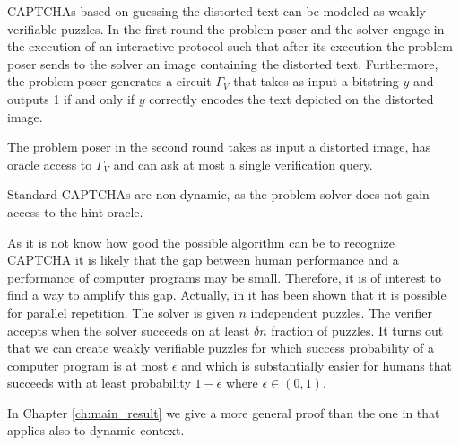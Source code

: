 CAPTCHAs based on guessing the distorted text can be modeled as weakly verifiable puzzles.
In the first round the problem poser and the solver engage in the execution of an interactive protocol
such that after its execution the problem poser sends to the solver an image containing the distorted text.
Furthermore, the problem poser generates a circuit $\Gamma_V$ that takes as input a bitstring $y$ and outputs 1 if and only if $y$ correctly encodes the
text depicted on the distorted image.

The problem poser in the second round takes as input a distorted image, has oracle access to $\Gamma_V$ and can ask at most a single verification query.

Standard CAPTCHAs are non-dynamic, as the problem solver does not gain access to the hint oracle.

As it is not know how good the possible algorithm can be to recognize CAPTCHA it is likely that the gap between human
performance and a performance of computer programs may be small. Therefore, it is of interest to find a way to amplify this gap.
Actually, in \cite{DBLP:journals/corr/abs-1002-3534} it has been shown that it is possible for parallel repetition.
The solver is given $n$ independent puzzles. The verifier accepts when the solver succeeds on at least $\delta n$ fraction of puzzles.
It turns out that we can create weakly verifiable puzzles for which success probability of a computer program is at most $\epsilon$ and
which is substantially easier for humans that succeeds with at least probability $1 - \epsilon$ where $\epsilon \in (0,1)$.

In Chapter \ref{ch:main_result} we give a more general proof than the one in \cite{DBLP:journals/corr/abs-1002-3534} that
applies also to dynamic context.

